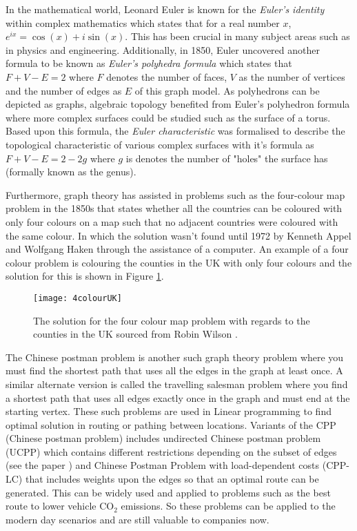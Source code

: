 In the mathematical world, Leonard Euler is known for the \emph{Euler's identity} within complex mathematics which states that for a real number $x$, $e^{ix}=\cos(x)+i\sin(x)$. This has been crucial in many subject areas such as in physics and engineering. Additionally, in 1850, Euler uncovered another formula to be known as \emph{Euler's polyhedra formula} which states that $F + V - E = 2$ where $F$ denotes the number of faces, $V$ as the number of vertices and the number of edges as $E$ of this graph model. As polyhedrons can be depicted as graphs, algebraic topology benefited from Euler's polyhedron formula where more complex surfaces could be studied such as the surface of a torus. Based upon this formula, the \emph{Euler characteristic} was formalised to describe the topological characteristic of various complex surfaces with it's formula as $F + V - E = 2 - 2g$ where $g$ is denotes the number of "holes" the surface has (formally known as the genus). 

Furthermore, graph theory has assisted in problems such as the four-colour map problem in the 1850s that states whether all the countries can be coloured with only four colours on a map such that no adjacent countries were coloured with the same colour. In which the solution wasn't found until 1972 by Kenneth Appel and Wolfgang Haken\cite{Ohnishi2009} through the assistance of a computer. An example of a four colour problem is colouring the counties in the UK with only four colours and the solution for this is shown in Figure \ref{fig:UK 4 colour}.
\newline

\begin{figure}[!htb]
\centering
\texttt{[image: 4colourUK]}
\caption{The solution for the four colour map problem with regards to the counties in the UK sourced from Robin Wilson \cite{4ColourRobin}.}
\label{fig:UK 4 colour}
\end{figure}

The Chinese postman problem is another such graph theory problem where you must find the shortest path that uses all the edges in the graph at least once. A similar alternate version is called the travelling salesman problem where you find a shortest path that uses all edges exactly once in the graph and must end at the starting vertex. These such problems are used in Linear programming to find optimal solution in routing or pathing between locations. Variants of the CPP (Chinese postman problem) includes undirected Chinese postman problem (UCPP) which contains different restrictions depending on the subset of edges (see the paper \cite{IrnichStefan2008Uppw}) and Chinese Postman Problem with load-dependent costs (CPP-LC\cite{CorberánÁngel2018TCPP}) that includes weights upon the edges so that an optimal route can be generated. This can be widely used and applied to problems such as the best route to lower vehicle CO$_2$ emissions. So these problems can be applied to the modern day scenarios and are still valuable to companies now.
\newline

